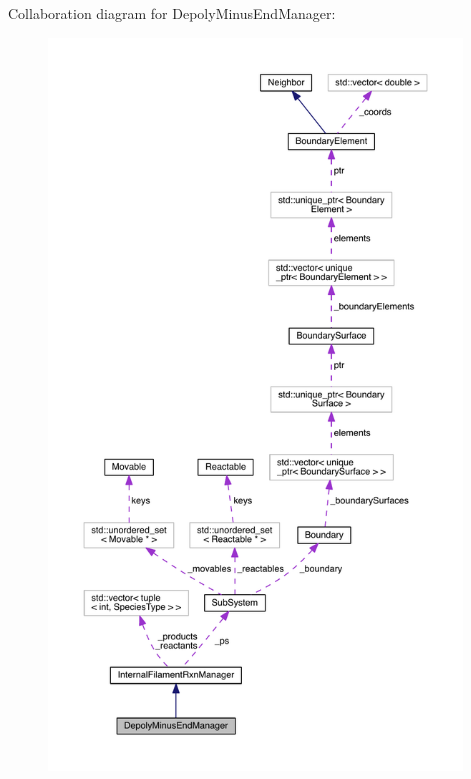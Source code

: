 Collaboration diagram for Depoly\+Minus\+End\+Manager\+:\nopagebreak
\begin{figure}[H]
\begin{center}
\leavevmode
\includegraphics[height=550pt]{classDepolyMinusEndManager__coll__graph}
\end{center}
\end{figure}
